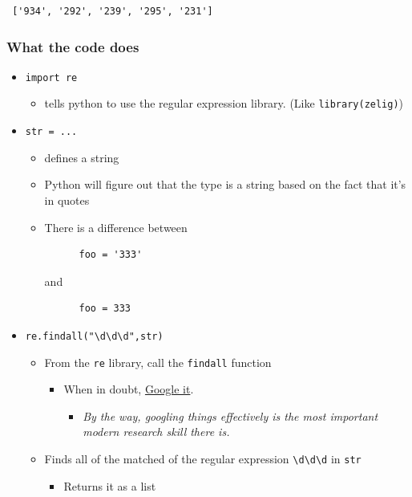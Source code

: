\documentclass[11pt]{article}
\begin{document}
\begin{verbatim}
 ['934', '292', '239', '295', '231']
\end{verbatim}
\subsubsection{What the code does}
\label{sec-3-1-1}

\begin{itemize}
\item \texttt{import re}
\begin{itemize}
\item tells python to use the regular expression library.  (Like \texttt{library(zelig)})
\end{itemize}
\item \texttt{str = ...}
\begin{itemize}
\item defines a string
\item Python will figure out that the type is a string based on the fact that it's in quotes
\item There is a difference between
\begin{verbatim}
      foo = '333'
\end{verbatim}
     and
\begin{verbatim}
      foo = 333
\end{verbatim}
\end{itemize}
\item \texttt{re.findall("\textbackslash{}d\textbackslash{}d\textbackslash{}d",str)}
\begin{itemize}
\item From the \texttt{re} library, call the \texttt{findall} function
\begin{itemize}
\item When in doubt, \href{https://www.google.com/search?sourceid=chrome&ie=UTF-8&q=re.findall}{Google it}.
\begin{itemize}
\item \emph{By the way, googling things effectively is the most important          modern research skill there is.}
\end{itemize}
\end{itemize}
\item Finds all of the matched of the regular expression \texttt{\textbackslash{}d\textbackslash{}d\textbackslash{}d} in \texttt{str}
\begin{itemize}
\item Returns it as a list
\end{itemize}
\end{itemize}
\end{itemize}
\end{document}

